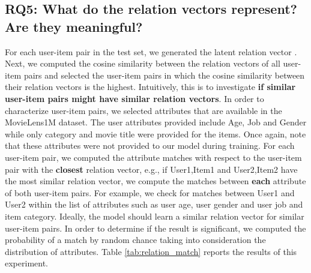 \documentclass[sigconf]{acmart}
\begin{document}
\subsection{RQ5: What do the relation vectors represent? Are they meaningful?}
For each user-item pair in the test set, we generated the latent relation vector . Next, we computed the cosine similarity between
the relation vectors of all user-item pairs and selected the user-item pairs in which the cosine similarity between their relation vectors
is the highest. Intuitively, this is to investigate \textbf{if similar user-item pairs might have similar relation vectors}. In order to characterize user-item pairs, we selected attributes that are available in the MovieLens1M dataset. The user attributes provided include Age, Job and Gender while only category and movie title were provided for the items. Once again, note that these attributes were not provided to our model during training. For each user-item pair, we computed the attribute matches with respect to the user-item pair with the \textbf{closest} relation vector, e.g., if User1,Item1 and User2,Item2 have the most similar relation vector, we compute the matches between \textbf{each} attribute of both user-item pairs. For example, we check for matches between User1 and User2 within the list of attributes such as user age, user gender and user job and item category. Ideally, the model should learn a similar relation vector for similar user-item pairs. In order to determine if the result is significant, we computed the probability of a match by random chance taking into consideration the distribution of attributes. Table \ref{tab:relation_match} reports the results of this experiment. 
\end{document}
